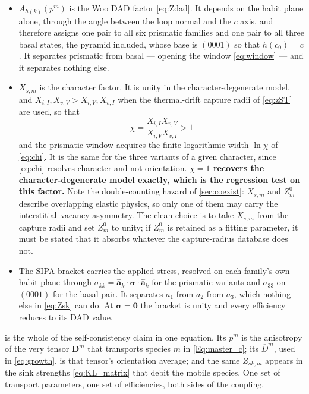 \documentclass{article}
\begin{document}
\begin{itemize}
\item $A_{h(k)}(p^m)$ is the Woo DAD factor \cref{eq:Zdad}. It depends on the
      habit plane alone, through the angle between the loop normal and the $c$
      axis, and therefore assigns one pair to all six prismatic families and one
      pair to all three basal states, the pyramid included, whose base is
      $(0001)$ so that $h(c_0)=c$. It separates prismatic from basal --- opening
      the window \cref{eq:window} --- and it separates nothing else.
\item $X_{s,m}$ is the character factor. It is unity in the
      character-degenerate model, and $X_{i,I},X_{v,V}>X_{i,V},X_{v,I}$ when the
      thermal-drift capture radii of \cref{eq:zST} are used, so that
      \begin{equation}
        \chi=\frac{X_{i,I}X_{v,V}}{X_{i,V}X_{v,I}}>1
        \label{eq:chi-from-X}
      \end{equation}
      and the prismatic window acquires the finite logarithmic width $\ln\chi$
      of \cref{eq:chi}. It is the same for the three variants of a given
      character, since \cref{eq:chi} resolves character and not orientation.
      \textbf{$\chi=1$ recovers the character-degenerate model exactly, which is
      the regression test on this factor.} Note the double-counting hazard of
      \cref{sec:coexist}: $X_{s,m}$ and $Z^0_m$ describe overlapping elastic
      physics, so only one of them may carry the interstitial--vacancy
      asymmetry. The clean choice is to take $X_{s,m}$ from the capture radii
      and set $Z^0_m$ to unity; if $Z^0_m$ is retained as a fitting parameter, it
      must be stated that it absorbs whatever the capture-radius database does
      not.
\item The SIPA bracket carries the applied stress, resolved on each family's own
      habit plane through $\sigma_{kk}=\hat{\bm a}_k\cdot\bm\sigma\cdot\hat{\bm
      a}_k$ for the prismatic variants and $\sigma_{33}$ on $(0001)$ for the
      basal pair. It separates $a_1$ from $a_2$ from $a_3$, which nothing else
      in \cref{eq:Zsk} can do. At $\bm\sigma=\bm0$ the bracket is unity and every
      efficiency reduces to its DAD value.
\end{itemize}

 is the whole of the self-consistency claim in one equation. Its
$p^m$ is the anisotropy of the very tensor $\bm D^m$ that transports species $m$
in \cref{Eq:master_c}; its $\overline{D}^m$, used in \cref{eq:growth}, is that
tensor's orientation average; and the same $Z_{sk,m}$ appears in the sink
strengths \cref{eq:KL_matrix} that debit the mobile species. One set of
transport parameters, one set of efficiencies, both sides of the coupling.
\end{document}
